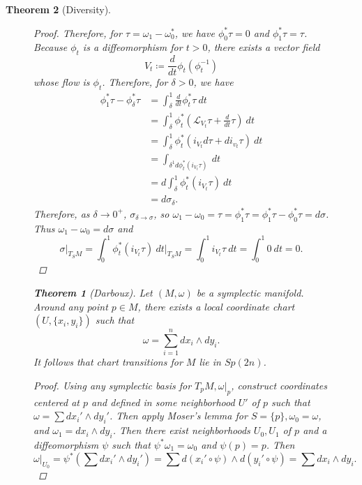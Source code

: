 \documentclass[leqno, openany]{memoir}
\newtheorem{thm}{Theorem}[chapter]
\theoremstyle{definition}
\theoremstyle{remark}
\theoremstyle{plain}
\theoremstyle{definition}
\theoremstyle{remark}
\newcommand{\mc}[1]{\mathcal{#1}}
\begin{document}
\begin{thm}[Diversity]
\begin{figure}[H]
\begin{proof}
    Therefore, for $\tau = \omega_1 - \omega_0^*$, we have $\phi_0^* \tau = 0$
    and $\phi_1^* \tau = \tau$. Because $\phi_t$ is a diffeomorphism for $t >
    0$, there exists a vector field \[ V_t \coloneqq \frac{d}{dt} \phi_t
    (\phi_t^{-1}) \] whose flow is $\phi_t$.  Therefore, for $\delta > 0$, we
    have \begin{align*} \phi_1^* \tau - \phi_{\delta}^* \tau &= \int_{\delta}^1
        \frac{d}{dt} \phi_t^* \tau \ dt \\ &= \int_{\delta}^1 \phi_t^* \left(
        \mc{L}_{V_t} \tau + \frac{d}{dt} \tau \right)\ dt \\ &= \int_{\delta}^1
        \phi_t^* (i_{V_t} d \tau + d i_{v_t} \tau)\ dt \\ &= \int_{\delta^1 d
        \phi_t^* (i_{V_t} \tau)}\ dt \\ &= d \int_{\delta}^1 \phi_t^* (i_{V_t}
        \tau)\ dt \\ &= d \sigma_{\delta}.  \end{align*} Therefore, as $\delta
        \to 0^+$, $\sigma_{\delta \to \sigma}$, so $\omega_1 - \omega_0 = \tau
        = \phi_1^* \tau = \phi_1^* \tau - \phi_0^* \tau = d \sigma$. Thus
        $\omega_1 - \omega_0 = d \sigma$ and \[ \sigma |_{T_S M} = \int_0^1
        \phi_t^* (i_{V_t} \tau)\ dt \bigg \vert_{T_S M} = \int_0^1 i_{V_t}
    \tau\ dt = \int_0^1 0\ dt = 0.\] \end{proof}

    \begin{thm}[Darboux] Let $(M, \omega)$ be a symplectic manifold. Around any
        point $p \in M$, there exists a local coordinate chart $(U, \{x_i, y_i
        \})$ such that \[ \omega = \sum_{i=1}^n dx_i \wedge dy_i. \] It follows
        that chart transitions for $M$ lie in $Sp(2n)$.  \end{thm}

    \begin{proof} Using any symplectic basis for $T_p M, \omega|_p$, construct
        coordinates centered at $p$ and defined in some neighborhood $U'$ of
        $p$ such that $\omega = \sum dx_i' \wedge dy_i'$. Then apply Moser's
        lemma for $S = \{p\}, \omega_0 = \omega$, and $\omega_1 = dx_i \wedge
        dy_i$. Then there exist neighborhoods $U_0, U_1$ of $p$ and a
        diffeomorphism $\psi$ such that $\psi^* \omega_1 = \omega_0$ and
        $\psi(p) = p$. Then \[ \omega |_{U_0} = \psi^* \left( \sum dx_i' \wedge
        dy_i' \right) = \sum d(x_i' \circ \psi) \wedge d(y_i' \circ \psi) =
    \sum dx_i \wedge dy_i. \] \end{proof}


\end{figure}
\end{thm}
\end{document}
